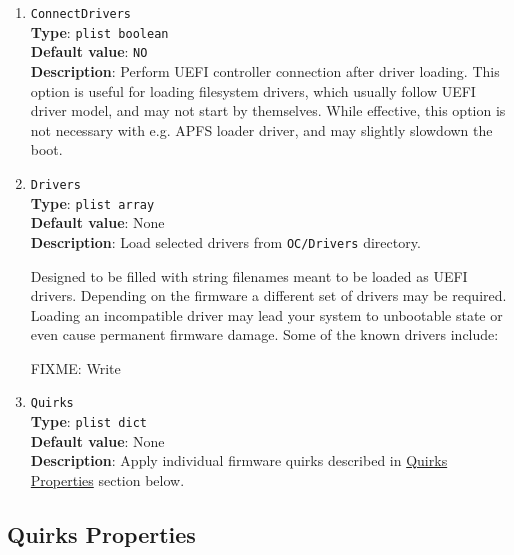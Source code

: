 \documentclass[]{article}
\begin{document}
\begin{enumerate}
\item
  \texttt{ConnectDrivers}\\
  \textbf{Type}: \texttt{plist\ boolean}\\
  \textbf{Default value}: \texttt{NO}\\
  \textbf{Description}: Perform UEFI controller connection after driver
  loading. This option is useful for loading filesystem drivers, which
  usually follow UEFI driver model, and may not start by themselves.
  While effective, this option is not necessary with e.g. APFS loader
  driver, and may slightly slowdown the boot.

\item
  \texttt{Drivers}\\
  \textbf{Type}: \texttt{plist\ array}\\
  \textbf{Default value}: None\\
  \textbf{Description}: Load selected drivers from \texttt{OC/Drivers}
  directory.

  Designed to be filled with string filenames meant to be loaded as UEFI
  drivers. Depending on the firmware a different set of drivers may be required.
  Loading an incompatible driver may lead your system to unbootable state or
  even cause permanent firmware damage. Some of the known drivers include:

  FIXME: Write
\item
  \texttt{Quirks}\\
  \textbf{Type}: \texttt{plist\ dict}\\
  \textbf{Default value}: None\\
  \textbf{Description}: Apply individual firmware quirks described in
  \hyperref[uefiquirkprops]{Quirks Properties} section below.

\end{enumerate}

\subsection{Quirks Properties}\label{uefiquirkprops}
\end{document}
